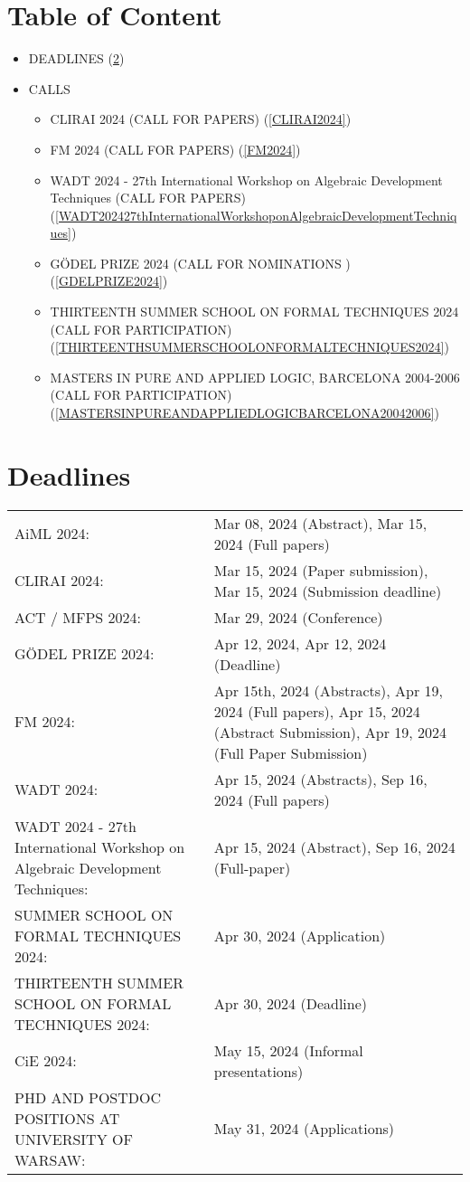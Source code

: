 \documentclass[prodmode,acmtecs]{acmsmall} %
\begin{document}
\section{Table of Content}\begin{itemize}\item DEADLINES (\cref{deadlines}) 
 
\item CALLS 
 
\begin{itemize}\item CLIRAI 2024 (CALL FOR PAPERS) (\cref{CLIRAI2024})
\item FM 2024 (CALL FOR PAPERS) (\cref{FM2024})
\item WADT 2024 - 27th International Workshop on Algebraic Development Techniques (CALL FOR PAPERS) (\cref{WADT202427thInternationalWorkshoponAlgebraicDevelopmentTechniques})
\item GÖDEL PRIZE 2024 (CALL FOR NOMINATIONS ) (\cref{GDELPRIZE2024})
\item THIRTEENTH SUMMER SCHOOL ON FORMAL TECHNIQUES 2024 (CALL FOR PARTICIPATION) (\cref{THIRTEENTHSUMMERSCHOOLONFORMALTECHNIQUES2024})
\item MASTERS IN PURE AND APPLIED LOGIC, BARCELONA 2004-2006 (CALL FOR PARTICIPATION) (\cref{MASTERSINPUREANDAPPLIEDLOGICBARCELONA20042006})
\end{itemize} 
\end{itemize}\section{Deadlines}\label{deadlines}\begin{tabulary}{\linewidth}{LL}AiML 2024:  & Mar 08, 2024 (Abstract), Mar 15, 2024 (Full papers) \\
CLIRAI 2024:  & Mar 15, 2024 (Paper submission), Mar 15, 2024 (Submission deadline) \\
ACT / MFPS 2024:  & Mar 29, 2024 (Conference) \\
GÖDEL PRIZE 2024:  & Apr 12, 2024, Apr 12, 2024 (Deadline) \\
FM 2024:  & Apr 15th, 2024 (Abstracts), Apr 19, 2024 (Full papers), Apr 15, 2024 (Abstract Submission), Apr 19, 2024 (Full Paper Submission) \\
WADT 2024:  & Apr 15, 2024 (Abstracts), Sep 16, 2024 (Full papers) \\
WADT 2024 - 27th International Workshop on Algebraic Development Techniques:  & Apr 15, 2024 (Abstract), Sep 16, 2024 (Full-paper) \\
SUMMER SCHOOL ON FORMAL TECHNIQUES 2024:  & Apr 30, 2024 (Application) \\
THIRTEENTH SUMMER SCHOOL ON FORMAL TECHNIQUES 2024:  & Apr 30, 2024 (Deadline) \\
CiE 2024:  & May 15, 2024 (Informal presentations) \\
PHD AND POSTDOC POSITIONS AT UNIVERSITY OF WARSAW:  & May 31, 2024 (Applications) \\
\end{tabulary}
\end{document}
